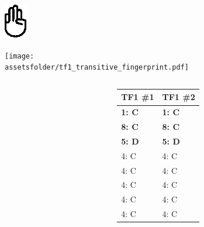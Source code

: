 \documentclass{beamer}
\newcommand{\assetsfolder}{./assets}
\newcommand{\researchfolder}{$HOME/rsc/axelrod-moran}
\begin{document}
\begin{frame}
    \begin{center}
        \scalebox{.7}{
            
        }
    \end{center}
\end{frame}


\begin{frame}
    \begin{center}
        \includegraphics[height=.8\textheight]{./assets/hunger-games-hand-gesture.eps}


        \tiny
        \vfill
    \end{center}
\end{frame}


\begin{frame}
    \begin{center}
        \texttt{[image: \\assetsfolder/tf1\_transitive\_fingerprint.pdf]}
    \end{center}
\end{frame}

\begin{frame}
    \begin{columns}
        \begin{column}{.6\textwidth}
            \begin{center}
                \scalebox{.49}{
                    
                }
            \end{center}
        \end{column}

        \begin{column}{.4\textwidth}
            \small
            \begin{tabular}{ll}
                \toprule
                TF1 \#1   & TF1 \#2\\
                \midrule
                \bf{1}: C & \bf{1}: C  \\
                \bf{8}: C & \bf{8}: C  \\
                \bf{5}: D & \bf{5}: D  \\
                4: C      & 4: C  \\
                4: C      & 4: C  \\
                4: C      & 4: C  \\
                4: C      & 4: C  \\
                4: C      & 4: C  \\
                \bottomrule
            \end{tabular}
        \end{column}
    \end{columns}
\end{frame}
\end{document}
